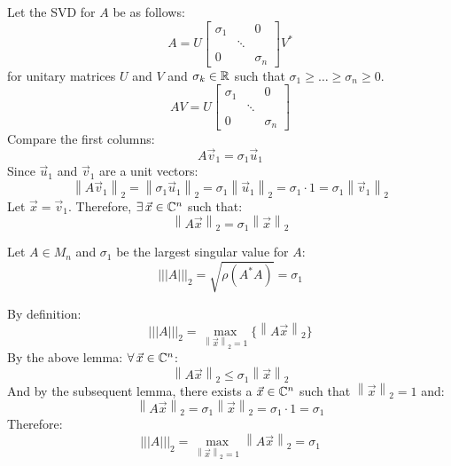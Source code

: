 \documentclass[letterpaper,12pt,fleqn]{article}
\renewcommand{\r}{\rho}
\renewcommand{\o}{\sigma}
\newcommand{\vx}{\vec{x}}
\newcommand{\vu}{\vec{u}}
\newcommand{\vv}{\vec{v}}
\newcommand{\norm}[1]{\left\lVert#1\right\rVert}
\newcommand{\mnorm}[1]{\left\lvert\left\lvert\left\lvert#1
  \right\rvert\right\rvert\right\rvert}
\begin{document}
\begin{theproof}
  Let the SVD for $A$ be as follows:
  \[A=U\begin{bmatrix} \o_1 & & 0 \\ & \ddots & \\ 0 & & \o_n
  \end{bmatrix}V^*\]
  for unitary matrices $U$ and $V$ and $\o_k\in\R$ such that
  $\o_1\ge\ldots\ge\o_n\ge0$.
  \[AV=U\begin{bmatrix} \o_1 & & 0 \\ & \ddots & \\ 0 & & \o_n
  \end{bmatrix}\]
  Compare the first columns:
  \[A\vv_1=\o_1\vu_1\]
  Since $\vu_1$ and $\vv_1$ are a unit vectors:
  \[\norm{A\vv_1}_2=\norm{\o_1\vu_1}_2=\o_1\norm{\vu_1}_2=\o_1\cdot1=
  \o_1\norm{\vv_1}_2\]
  Let $\vx=\vv_1$. Therefore, $\exists\,\vx\in\C^n$ such that:
  \[\norm{A\vx}_2=\o_1\norm{\vx}_2\]
\end{theproof}

\begin{theorem}
  Let $A\in M_n$ and $\o_1$ be the largest singular value for $A$:
  \[\mnorm{A}_2=\sqrt{\r(A^*A)}=\o_1\]
\end{theorem}

\begin{theproof}
  By definition:
  \[\mnorm{A}_2=\max_{\norm{\vx}_2=1}\{\norm{A\vx}_2\}\]
  By the above lemma: $\forall\,\vx\in\C^n$:
  \[\norm{A\vx}_2\le\o_1\norm{\vx}_2\]
  And by the subsequent lemma, there exists a $\vx\in\C^n$ such that
  $\norm{\vx}_2=1$ and:
  \[\norm{A\vx}_2=\o_1\norm{\vx}_2=\o_1\cdot1=\o_1\]
  Therefore:
  \[\mnorm{A}_2=\max_{\norm{\vx}_2=1}\norm{A\vx}_2=\o_1\]
\end{theproof}
\end{document}
